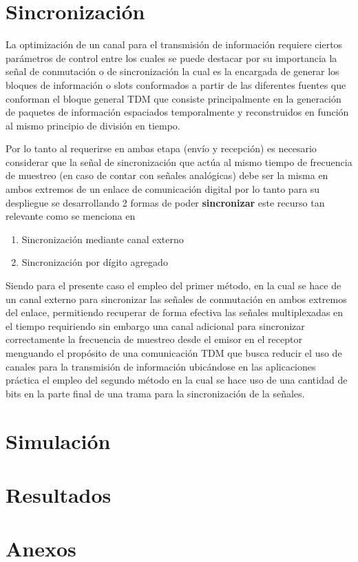 \documentclass[conference]{IEEEtran}
\begin{document}
	\section{Sincronización}
	
	La optimización de un canal para el transmisión de información requiere ciertos parámetros de control entre los cuales se puede destacar por su importancia la señal de conmutación o de sincronización la cual es la encargada de generar los bloques de información o slots conformados a partir de las diferentes fuentes que conforman el bloque general TDM que consiste principalmente en la generación de paquetes de información espaciados temporalmente y reconstruidos en función al mismo principio de división en tiempo.
	
	Por lo tanto al requerirse en ambas etapa (envío y recepción) es necesario considerar que la señal de sincronización que actúa al mismo tiempo de frecuencia de muestreo (en caso de contar con señales analógicas) debe ser la misma en ambos extremos de un enlace de comunicación digital por lo tanto para su despliegue se desarrollando 2 formas de poder \textbf{sincronizar} este recurso tan relevante como se menciona en \cite{couch2012sistemas}
	
	\begin{enumerate}
		\item Sincronización mediante canal externo
		\item Sincronización por dígito agregado
	\end{enumerate}
	
	Siendo para el presente caso el empleo del primer método, en la cual se hace de un canal externo para sincronizar las señales de conmutación en ambos extremos del enlace, permitiendo recuperar de forma efectiva las señales multiplexadas en el tiempo requiriendo sin embargo una canal adicional para sincronizar correctamente la frecuencia de muestreo desde el emisor en el receptor menguando el propósito de una comunicación TDM que busca reducir el uso de canales para la transmisión de información ubicándose en las aplicaciones práctica el empleo del segundo método en la cual se hace uso de una cantidad de bits en la parte final de una trama para la sincronización de la señales.
	
	\section{Simulación}
	
	
	\section{Resultados}
	
	
	\section{Anexos}
	
	
	
\end{document}
